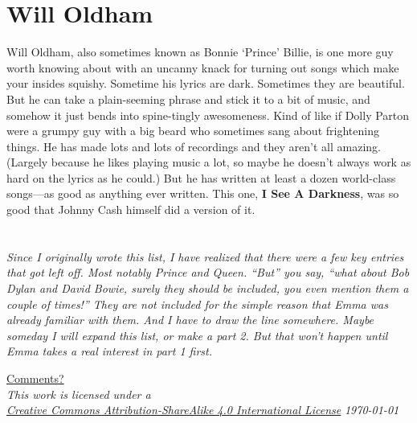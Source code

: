 \documentclass[letterpaper,single]{article}
\begin{document}
\section{Will Oldham}
Will Oldham, also sometimes known as Bonnie `Prince' Billie, is one more guy worth knowing about with an uncanny knack for turning out songs which make your insides squishy. 
Sometime his lyrics are dark. 
Sometimes they are beautiful. 
But he can take a plain-seeming phrase and stick it to a bit of music, and somehow it just bends into spine-tingly awesomeness. 
Kind of like if Dolly Parton were a grumpy guy with a big beard who sometimes sang about frightening things.
He has made lots and lots of recordings and they aren't all amazing.
(Largely because he likes playing music a lot, so maybe he doesn't always work as hard on the lyrics as he could.) 
But he has written at least a dozen world-class songs---as good as anything ever written. This one, \textbf{I See A Darkness}, was so good that Johnny Cash himself did a version of it.\\
\\
\\
\itshape
Since I originally wrote this list, I have realized that there were a few key entries that got left off.
Most notably Prince and Queen.
``But'' you say, ``what about Bob Dylan and David Bowie, surely they should be included, you even mention them a couple of times!''
They are not included for the simple reason that Emma was already familiar with them.
And I have to draw the line somewhere. Maybe someday I will expand this list, or make a part 2. 
But that won't happen until Emma takes a real interest in part 1 first.
\upshape
\\
\begin{center}
  \small
  \href{mailto://kunstcleaver@gmail.com}{Comments?}\\
  \textit{This work is licensed under a \\\href{http://creativecommons.org/licenses/by-sa/4.0/}{Creative Commons Attribution-ShareAlike 4.0 International License}}
  \textit{\today}\\
\end{center}
\end{document}
